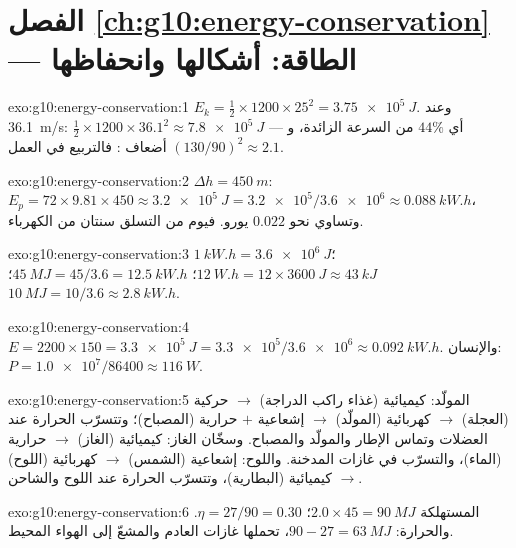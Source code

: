 \section*{الفصل \ref{ch:g10:energy-conservation} --- الطاقة: أشكالها وانحفاظها}

\begin{solution}{exo:g10:energy-conservation:1}
$E_k = \tfrac12 \times 1200 \times 25^2 = \qty{3.75e5}{J}$. وعند
\qty{36.1}{m/s}: $\tfrac12 \times 1200 \times 36.1^2 \approx
\qty{7.8e5}{J}$ --- أي $44\%$ من السرعة الزائدة، و$(130/90)^2 \approx 2.1$
أضعاف : فالتربيع في العمل.
\end{solution}

\begin{solution}{exo:g10:energy-conservation:2}
$\Delta h = \qty{450}{m}$:
$E_p = 72 \times 9.81 \times 450 \approx \qty{3.2e5}{J}
= \num{3.2e5}/\num{3.6e6} \approx \qty{0.088}{kW.h}$، وتساوي نحو
$0.022$ يورو. فيوم من التسلق سنتان من الكهرباء.
\end{solution}

\begin{solution}{exo:g10:energy-conservation:3}
$\qty{1}{kW.h} = \qty{3.6e6}{J}$؛
$\qty{12}{W.h} = 12 \times \qty{3600}{J} \approx \qty{43}{kJ}$؛
$\qty{45}{MJ} = 45/3.6 = \qty{12.5}{kW.h}$؛
$\qty{10}{MJ} = 10/3.6 \approx \qty{2.8}{kW.h}$.
\end{solution}

\begin{solution}{exo:g10:energy-conservation:4}
$E = 2200 \times 150 = \qty{3.3e5}{J}
= \num{3.3e5}/\num{3.6e6} \approx \qty{0.092}{kW.h}$. والإنسان:
$P = \num{1.0e7}/\num{86400} \approx \qty{116}{W}$.
\end{solution}

\begin{solution}{exo:g10:energy-conservation:5}
المولّد: كيميائية (غذاء راكب الدراجة) $\to$ حركية (العجلة) $\to$
كهربائية (المولّد) $\to$ إشعاعية $+$ حرارية (المصباح)؛ وتتسرّب الحرارة
عند العضلات وتماس الإطار والمولّد والمصباح. وسخّان الغاز: كيميائية (الغاز)
$\to$ حرارية (الماء)، والتسرّب في غازات المدخنة. واللوح: إشعاعية
(الشمس) $\to$ كهربائية (اللوح) $\to$ كيميائية (البطارية)، وتتسرّب الحرارة
عند اللوح والشاحن.
\end{solution}

\begin{solution}{exo:g10:energy-conservation:6}
المستهلكة $2.0 \times 45 = \qty{90}{MJ}$؛ $\eta = 27/90 = 0.30$.
والحرارة: $90 - 27 = \qty{63}{MJ}$، تحملها غازات العادم
والمشعّ إلى الهواء المحيط.
\end{solution}


